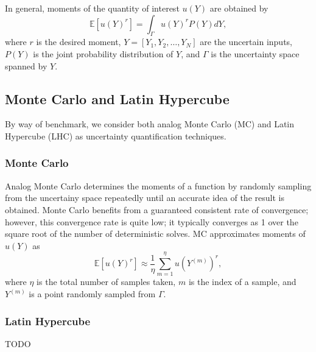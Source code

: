\documentclass[11pt]{article}
\newcommand{\expv}[1]{\ensuremath{\mathbb{E}[ #1]}}
\begin{document}
In general, moments of the quantity of interest $u(Y)$ are obtained by
\begin{equation}
\expv{u(Y)^r} = \int_\Gamma u(Y)^r P(Y) dY,
\end{equation}
where $r$ is the desired moment, $Y=[Y_1,Y_2,\ldots,Y_N]$ are the uncertain inputs, $P(Y)$ is the joint probability distribution of $Y$, and $\Gamma$ is the uncertainty space spanned by $Y$.

\subsection{Monte Carlo and Latin Hypercube}
By way of benchmark, we consider both analog Monte Carlo (MC) and Latin Hypercube (LHC) as uncertainty quantification techniques.
\subsubsection{Monte Carlo}
Analog Monte Carlo determines the moments of a function by randomly sampling from the uncertainy space repeatedly until an accurate idea of the result is obtained.  Monte Carlo benefits from a guaranteed consistent rate of convergence; however, this convergence rate is quite low; it typically converges as 1 over the square root of the number of deterministic solves.
MC approximates moments of $u(Y)$ as
\begin{equation}
\expv{u(Y)^r}\approx \frac{1}{\eta}\sum_{m=1}^\eta u(Y^{(m)})^r,
\end{equation}
where $\eta$ is the total number of samples taken, $m$ is the index of a sample, and $Y^{(m)}$ is a point randomly sampled from $\Gamma$.

\subsubsection{Latin Hypercube}
TODO
\end{document}
